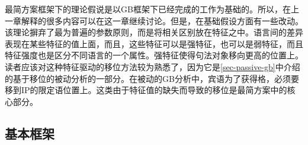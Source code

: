 最简方案框架下的理论假说是以GB框架下已经完成的工作为基础的。所以，在上一章解释的很多内容可以在这一章继续讨论。但是，在基础假设方面有一些改动。该理论摒弃了最为普遍的参数原则，而是将相关区别放在特征之中。语言间的差异表现在某些特征的值上面，而且，这些特征可以是强特征，也可以是弱特征，而且特征强度也是区分不同语言的一个属性。强特征使得句法对象移向更高的位置上。读者应该对这种特征驱动的移位方法较为熟悉了，因为它是\ref{sec-passive-gb}中介绍的基于移位的被动分析的一部分。在被动的GB分析中，宾语为了获得格，必须要移到IP的限定语位置上。这类由于特征值的缺失而导致的移位是最简方案中的核心部分。

\subsection{基本框架}

